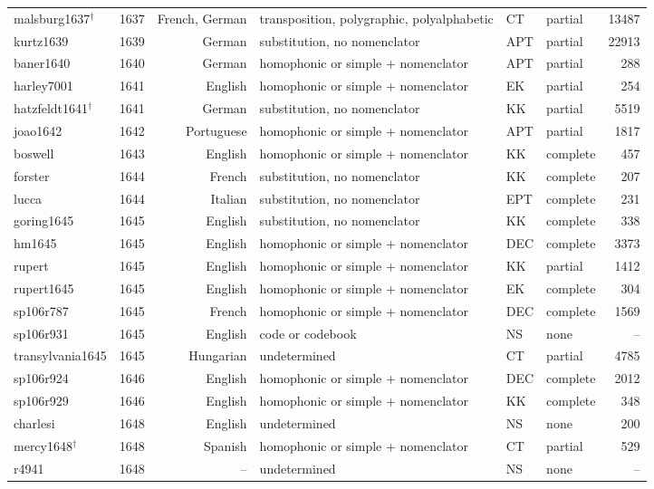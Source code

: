 {\begin{longtable}{@{}llrlllr@{}}
malsburg1637$^\dagger$ & 1637 & French, German & transposition, polygraphic, polyalphabetic & CT & partial & 13487 \\
kurtz1639 & 1639 & German & substitution, no nomenclator & APT & partial & 22913 \\
baner1640 & 1640 & German & homophonic or simple + nomenclator & APT & partial & 288 \\
harley7001 & 1641 & English & homophonic or simple + nomenclator & EK & partial & 254 \\
hatzfeldt1641$^\dagger$ & 1641 & German & substitution, no nomenclator & KK & partial & 5519 \\
joao1642 & 1642 & Portuguese & homophonic or simple + nomenclator & APT & partial & 1817 \\
boswell & 1643 & English & homophonic or simple + nomenclator & KK & complete & 457 \\
forster & 1644 & French & substitution, no nomenclator & KK & complete & 207 \\
lucca & 1644 & Italian & substitution, no nomenclator & EPT & complete & 231 \\
goring1645 & 1645 & English & substitution, no nomenclator & KK & complete & 338 \\
hm1645 & 1645 & English & homophonic or simple + nomenclator & DEC & complete & 3373 \\
rupert & 1645 & English & homophonic or simple + nomenclator & KK & partial & 1412 \\
rupert1645 & 1645 & English & homophonic or simple + nomenclator & EK & complete & 304 \\
sp106r787 & 1645 & French & homophonic or simple + nomenclator & DEC & complete & 1569 \\
sp106r931 & 1645 & English & code or codebook & NS & none & -- \\
transylvania1645 & 1645 & Hungarian & undetermined & CT & partial & 4785 \\
sp106r924 & 1646 & English & homophonic or simple + nomenclator & DEC & complete & 2012 \\
sp106r929 & 1646 & English & homophonic or simple + nomenclator & KK & complete & 348 \\
charlesi & 1648 & English & undetermined & NS & none & 200 \\
mercy1648$^\dagger$ & 1648 & Spanish & homophonic or simple + nomenclator & CT & partial & 529 \\
r4941 & 1648 & -- & undetermined & NS & none & -- \\

\end{longtable}}
